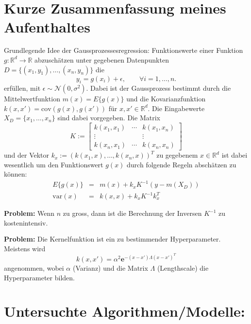 \documentclass[ngerman]{scrreprt}
\newcommand{\RR}{\mathbb{R}}
\newcommand{\cN}{\mathcal{N}}
\newcommand{\cov}{\mathrm{cov}}
\newcommand{\var}{\mathrm{var}}
\begin{document}
\section*{Kurze Zusammenfassung meines Aufenthaltes}

Grundlegende Idee der Gaussprozessesregression:  Funktionswerte einer  Funktion $g:\RR^d \rightarrow \RR$  abzuschätzen unter gegebenen Datenpunkten $D=\{ (x_1,y_1), \ldots, (x_n,y_n)\}$ die 
\begin{equation}
y_i = g(x_i) + \epsilon, \qquad \forall i=1,\ldots, n.
\end{equation}
erfüllen, mit $\epsilon \sim \cN(0,\sigma^2)$.  Dabei ist der Gaussprozess bestimmt durch die Mittelwertfunktion $m(x) = E\{g(x)\}$ und die Kovarianzfunktion $k(x,x') = \cov(g(x),g(x'))$ für $x,x'\in \RR^d$. 
Die Eingabewerte $X_D=\{x_1,\ldots, x_n\}$ sind dabei vorgegeben. Die Matrix 
\begin{equation}K := \left[ \begin{array}{ccc} k(x_1,x_1) & \cdots & k(x_1,x_n) \\ \vdots & & \vdots \\ k(x_n,x_1) & \cdots & k(x_n,x_n) \end{array} \right]\end{equation}
und der Vektor $k_x := ( k(x_1, x), \ldots, k(x_n,x) )^T$ zu gegebenem $x\in \RR^d$ ist dabei wesentlich um den Funktionswert $g(x)$ durch folgende Regeln abschätzen zu können:
\begin{eqnarray}
E\{ g(x)\} &=& m(x) + k_x K^{-1} \left(y-m(X_D)\right)\label{pred1}\\
\var(x) &=& k(x,x)  + k_x K^{-1} k_x^T\label{pred2}
\end{eqnarray}

{\bf Problem:} Wenn $n$ zu gross, dann ist die Berechnung der Inversen $K^{-1}$ zu kostenintensiv. 

{\bf Problem:} Die Kernelfunktion ist ein zu bestimmender Hyperparameter.  Meistens wird 
\begin{equation}
k(x,x') = \alpha^2 \mathbf{e}^{ - (x-x')\Lambda(x-x')^T}
\end{equation}
angenommen, wobei $\alpha$ (Varianz) und die Matrix $\Lambda$ (Lengthscale) die Hyperparameter bilden. 
\medskip

\section*{Untersuchte Algorithmen/Modelle:}
\end{document}
